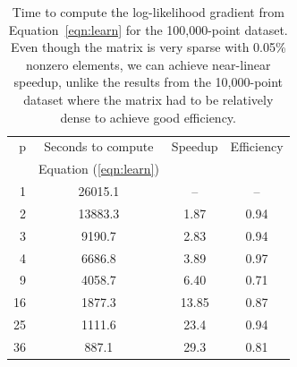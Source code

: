 \begin {table}
  \begin{center}
    \begin{tabular}{|r|c|c|c|}
      \hline
      p & Seconds to compute & Speedup & Efficiency \\
      & Equation (\ref{eqn:learn}) &  &  \\
      \hline
      1 & 26015.1 & -- & -- \\
      2 & 13883.3 & 1.87 & 0.94 \\
      3 & 9190.7 & 2.83 & 0.94 \\
      4 & 6686.8 & 3.89 & 0.97 \\
      9 & 4058.7 & 6.40 & 0.71 \\
      16 & 1877.3 & 13.85 & 0.87 \\
      25 & 1111.6 & 23.4 & 0.94 \\
      36 & 887.1 & 29.3 & 0.81 \\
      \hline
    \end{tabular}
    \caption {{\small Time to compute the log-likelihood gradient from
        Equation~\ref{eqn:learn} for the 100,000-point dataset.  Even though the matrix is
        very sparse with 0.05\% nonzero elements, we can achieve near-linear speedup,
        unlike the results from the 10,000-point dataset where the matrix had to be
        relatively dense to achieve good efficiency.}}
    \label{tab:gradBig}
  \end{center}
\end {table}

